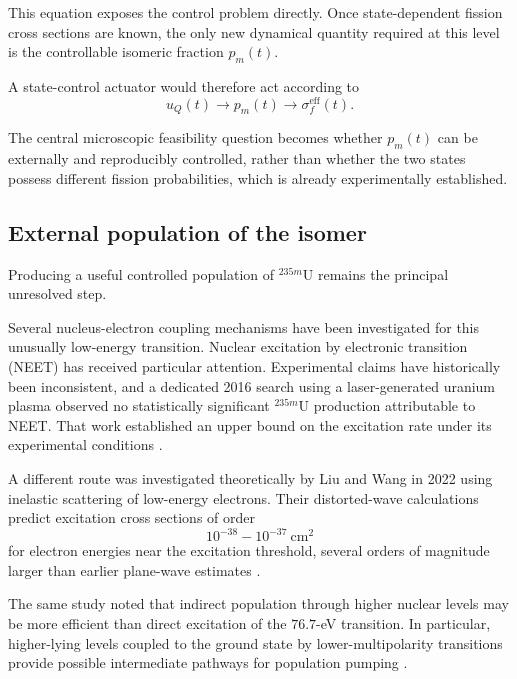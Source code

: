 This equation exposes the control problem directly. Once state-dependent fission cross sections are known, the only new dynamical quantity required at this level is the controllable isomeric fraction $p_m(t)$.

A state-control actuator would therefore act according to
\begin{equation}
u_Q(t)\longrightarrow p_m(t)\longrightarrow\sigma_f^{\mathrm{eff}}(t).
\end{equation}

The central microscopic feasibility question becomes whether $p_m(t)$ can be externally and reproducibly controlled, rather than whether the two states possess different fission probabilities, which is already experimentally established.

\subsection{External population of the isomer}

Producing a useful controlled population of $^{235m}\mathrm{U}$ remains the principal unresolved step.

Several nucleus-electron coupling mechanisms have been investigated for this unusually low-energy transition. Nuclear excitation by electronic transition (NEET) has received particular attention. Experimental claims have historically been inconsistent, and a dedicated 2016 search using a laser-generated uranium plasma observed no statistically significant $^{235m}\mathrm{U}$ production attributable to NEET. That work established an upper bound on the excitation rate under its experimental conditions \cite{chodash2016}.

A different route was investigated theoretically by Liu and Wang in 2022 using inelastic scattering of low-energy electrons. Their distorted-wave calculations predict excitation cross sections of order
\begin{equation}
10^{-38}-10^{-37}\ \mathrm{cm^2}
\end{equation}
for electron energies near the excitation threshold, several orders of magnitude larger than earlier plane-wave estimates \cite{liu2022}.

The same study noted that indirect population through higher nuclear levels may be more efficient than direct excitation of the $76.7$-eV transition. In particular, higher-lying levels coupled to the ground state by lower-multipolarity transitions provide possible intermediate pathways for population pumping \cite{liu2022}.

